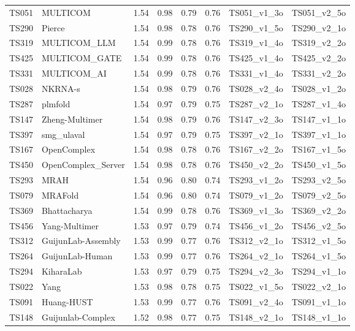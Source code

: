 \begin{longtable}{llllllll}
TS051 & MULTICOM & 1.54 & 0.98 & 0.79 & 0.76 & TS051\_v1\_3o & TS051\_v2\_5o \\ 
TS290 & Pierce & 1.54 & 0.98 & 0.78 & 0.76 & TS290\_v1\_5o & TS290\_v2\_1o \\ 
TS319 & MULTICOM\_LLM & 1.54 & 0.99 & 0.78 & 0.76 & TS319\_v1\_4o & TS319\_v2\_2o \\ 
TS425 & MULTICOM\_GATE & 1.54 & 0.99 & 0.78 & 0.76 & TS425\_v1\_4o & TS425\_v2\_2o \\ 
TS331 & MULTICOM\_AI & 1.54 & 0.99 & 0.78 & 0.76 & TS331\_v1\_4o & TS331\_v2\_2o \\ 
TS028 & NKRNA-s & 1.54 & 0.98 & 0.79 & 0.76 & TS028\_v2\_4o & TS028\_v1\_2o \\ 
TS287 & plmfold & 1.54 & 0.97 & 0.79 & 0.75 & TS287\_v2\_1o & TS287\_v1\_4o \\ 
TS147 & Zheng-Multimer & 1.54 & 0.98 & 0.79 & 0.76 & TS147\_v2\_3o & TS147\_v1\_1o \\ 
TS397 & smg\_ulaval & 1.54 & 0.97 & 0.79 & 0.75 & TS397\_v2\_1o & TS397\_v1\_1o \\ 
TS167 & OpenComplex & 1.54 & 0.98 & 0.78 & 0.76 & TS167\_v2\_2o & TS167\_v1\_5o \\ 
TS450 & OpenComplex\_Server & 1.54 & 0.98 & 0.78 & 0.76 & TS450\_v2\_2o & TS450\_v1\_5o \\ 
TS293 & MRAH & 1.54 & 0.96 & 0.80 & 0.74 & TS293\_v1\_2o & TS293\_v2\_5o \\ 
TS079 & MRAFold & 1.54 & 0.96 & 0.80 & 0.74 & TS079\_v1\_2o & TS079\_v2\_5o \\ 
TS369 & Bhattacharya & 1.54 & 0.99 & 0.78 & 0.76 & TS369\_v1\_3o & TS369\_v2\_2o \\ 
TS456 & Yang-Multimer & 1.53 & 0.97 & 0.79 & 0.74 & TS456\_v1\_2o & TS456\_v2\_5o \\ 
TS312 & GuijunLab-Assembly & 1.53 & 0.99 & 0.77 & 0.76 & TS312\_v2\_1o & TS312\_v1\_5o \\ 
TS264 & GuijunLab-Human & 1.53 & 0.99 & 0.77 & 0.76 & TS264\_v2\_1o & TS264\_v1\_5o \\ 
TS294 & KiharaLab & 1.53 & 0.97 & 0.79 & 0.75 & TS294\_v2\_3o & TS294\_v1\_1o \\ 
TS022 & Yang & 1.53 & 0.98 & 0.78 & 0.75 & TS022\_v1\_5o & TS022\_v2\_1o \\ 
TS091 & Huang-HUST & 1.53 & 0.99 & 0.77 & 0.76 & TS091\_v2\_4o & TS091\_v1\_1o \\ 
TS148 & Guijunlab-Complex & 1.52 & 0.98 & 0.77 & 0.75 & TS148\_v2\_1o & TS148\_v1\_1o \\ 

\end{longtable}
